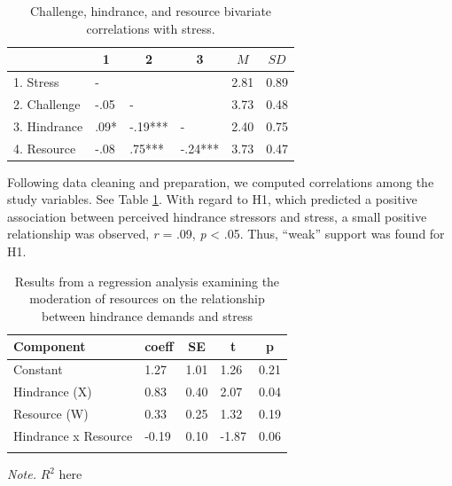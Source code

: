 \documentclass[
  man]{apa6}
\begin{document}
\begin{table}[tbp]

\begin{center}
\begin{threeparttable}

\caption{\label{tab:cortab}Challenge, hindrance, and resource bivariate correlations with stress.}

\begin{tabular}{llllll}
\toprule
 & \multicolumn{1}{c}{1} & \multicolumn{1}{c}{2} & \multicolumn{1}{c}{3} & \multicolumn{1}{c}{$M$} & \multicolumn{1}{c}{$SD$}\\
\midrule
1. Stress & - &  &  & 2.81 & 0.89\\
2. Challenge & -.05 & - &  & 3.73 & 0.48\\
3. Hindrance & .09* & -.19*** & - & 2.40 & 0.75\\
4. Resource & -.08 & .75*** & -.24*** & 3.73 & 0.47\\
\bottomrule
\end{tabular}

\end{threeparttable}
\end{center}

\end{table}

Following data cleaning and preparation, we computed correlations among the study variables. See Table \ref{tab:cortab}. With regard to H1, which predicted a positive association between perceived hindrance stressors and stress, a small positive relationship was observed, \emph{r} = .09, \emph{p} \textless{} .05. Thus, ``weak'' support was found for H1.

\begin{table}[tbp]

\begin{center}
\begin{threeparttable}

\caption{\label{tab:table}Results from a regression analysis examining the moderation of resources on the relationship between hindrance demands and stress}

\begin{tabular}{lllll}
\toprule
Component & \multicolumn{1}{c}{coeff} & \multicolumn{1}{c}{SE} & \multicolumn{1}{c}{t} & \multicolumn{1}{c}{p}\\
\midrule
Constant & 1.27 & 1.01 & 1.26 & 0.21\\
Hindrance (X) & 0.83 & 0.40 & 2.07 & 0.04\\
Resource (W) & 0.33 & 0.25 & 1.32 & 0.19\\
Hindrance x Resource & -0.19 & 0.10 & -1.87 & 0.06\\
\bottomrule
\addlinespace
\end{tabular}

\begin{tablenotes}[para]
\normalsize{\textit{Note.} $R^2$ here}
\end{tablenotes}

\end{threeparttable}
\end{center}

\end{table}
\end{document}
